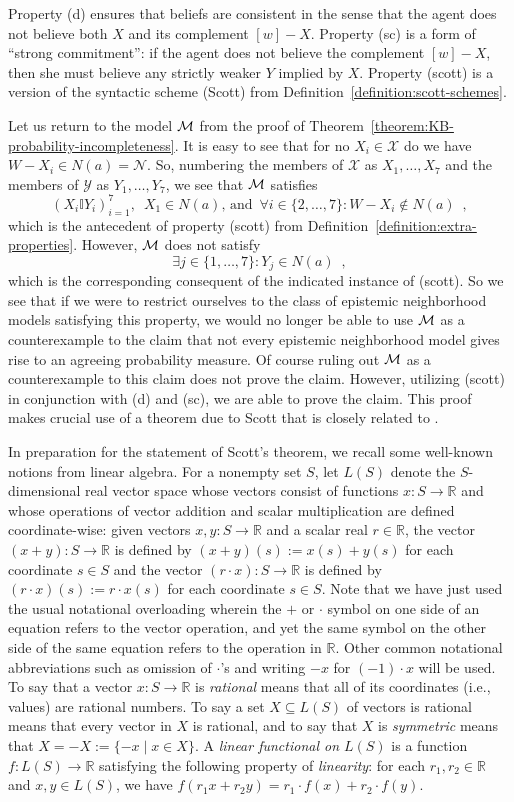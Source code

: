 \documentclass[12pt]{article}
\theoremstyle{definition}
\newcommand{\M}{{\cal M}}      %
\begin{document}
Property (d) ensures that beliefs are consistent in the sense that the
agent does not believe both $X$ and its complement $[w]-X$.
Property (sc) is a form of ``strong commitment'': if the agent does
not believe the complement $[w]-X$, then she must believe any
strictly weaker $Y$ implied by $X$.  Property (scott) is a version of
the syntactic scheme (Scott) from
Definition~\ref{definition:scott-schemes}.

Let us return to the model $\M$ from the proof of
Theorem~\ref{theorem:KB-probability-incompleteness}.  It is easy to
see that for no $X_i\in\mathcal{X}$ do we have
$W-X_i\in N(a)=\mathcal{N}$.  So, numbering the members of
$\mathcal{X}$ as $X_1,\dots,X_7$ and the members of $\mathcal{Y}$ as
$Y_1,\dots,Y_7$, we see that $\M$ satisfies
\[
(X_i\mathbb{I}Y_i)_{i=1}^7,\enspace X_1\in N(a)\text{, and}\enspace
\forall i\in\{2,\dots,7\}:W-X_i\notin N(a)\enspace,
\]
which is the antecedent of property (scott) from
Definition~\ref{definition:extra-properties}.  However, $\M$ does not
satisfy
\[
\exists j\in\{1,\dots,7\}:Y_j\in N(a)\enspace,
\]
which is the corresponding consequent of the indicated instance of
(scott).  So we see that if we were to restrict ourselves to the class
of epistemic neighborhood models satisfying this property, we would no
longer be able to use $\M$ as a counterexample to the claim that not
every epistemic neighborhood model gives rise to an agreeing
probability measure.  Of course ruling out $\M$ as a counterexample to
this claim does not prove the claim.  However, utilizing (scott) in
conjunction with (d) and (sc), we are able to prove the claim.  This
proof makes crucial use of a theorem due to Scott that is closely 
related to \cite[Theorem 4.1]{Sco64:JMP}. 

In preparation for the statement of Scott's theorem, we recall some
well-known notions from linear algebra.  For a nonempty set $S$, let
$L(S)$ denote the $S$-dimensional real vector space whose vectors
consist of functions $x:S\to\mathbb{R}$ and whose operations of vector
addition and scalar multiplication are defined coordinate-wise: given
vectors $x,y:S\to\mathbb{R}$ and a scalar real $r\in\mathbb{R}$, the
vector $(x+y):S\to\mathbb{R}$ is defined by $(x+y)(s):=x(s)+y(s)$ for
each coordinate $s\in S$ and the vector $(r\cdot x):S\to\mathbb{R}$ is
defined by $(r\cdot x)(s):=r\cdot x(s)$ for each coordinate $s\in S$.
Note that we have just used the usual notational overloading wherein the $+$
or $\cdot$ symbol on one side of an equation refers to the vector
operation, and yet the same symbol on the other side of the same
equation refers to the operation in $\mathbb{R}$. Other common
notational abbreviations such as omission of $\cdot$'s and writing
$-x$ for $(-1)\cdot x$ will be used. To say that a vector
$x:S\to\mathbb{R}$ is \emph{rational} means that all of its
coordinates (i.e., values) are rational numbers.  To say a set
$X\subseteq L(S)$ of vectors is rational means that every vector in
$X$ is rational, and to say that $X$ is \emph{symmetric} means that
$X=-X:=\{-x\mid x\in X\}$.  A \emph{linear functional on $L(S)$} is a
function $f:L(S)\to\mathbb{R}$ satisfying the following property of
\emph{linearity\/}: for each $r_1,r_2\in\mathbb{R}$ and $x,y\in L(S)$,
we have $f(r_1x+r_2y)=r_1\cdot f(x)+r_2\cdot f(y)$.
\end{document}

